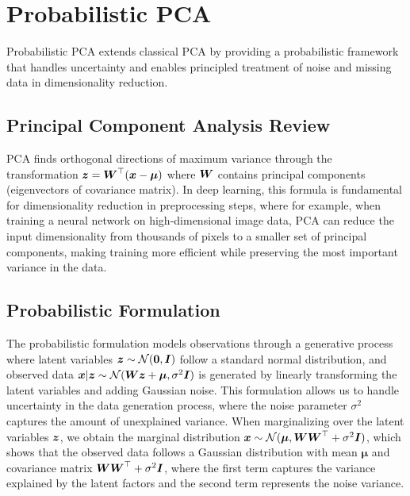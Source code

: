 
\section{Probabilistic PCA }
\label{sec:prob-pca}

Probabilistic PCA extends classical PCA by providing a probabilistic framework that handles uncertainty and enables principled treatment of noise and missing data in dimensionality reduction.

\subsection{Principal Component Analysis Review}

PCA finds orthogonal directions of maximum variance through the transformation $\boldsymbol{z} = \boldsymbol{W}^\top (\boldsymbol{x} - \boldsymbol{\mu})$ where $\boldsymbol{W}$ contains principal components (eigenvectors of covariance matrix). In deep learning, this formula is fundamental for dimensionality reduction in preprocessing steps, where for example, when training a neural network on high-dimensional image data, PCA can reduce the input dimensionality from thousands of pixels to a smaller set of principal components, making training more efficient while preserving the most important variance in the data.

\subsection{Probabilistic Formulation}

The probabilistic formulation models observations through a generative process where latent variables $\boldsymbol{z} \sim \mathcal{N}(\boldsymbol{0}, \boldsymbol{I})$ follow a standard normal distribution, and observed data $\boldsymbol{x} | \boldsymbol{z} \sim \mathcal{N}(\boldsymbol{W}\boldsymbol{z} + \boldsymbol{\mu}, \sigma^2 \boldsymbol{I})$ is generated by linearly transforming the latent variables and adding Gaussian noise. This formulation allows us to handle uncertainty in the data generation process, where the noise parameter $\sigma^2$ captures the amount of unexplained variance. When marginalizing over the latent variables $\boldsymbol{z}$, we obtain the marginal distribution $\boldsymbol{x} \sim \mathcal{N}(\boldsymbol{\mu}, \boldsymbol{W}\boldsymbol{W}^\top + \sigma^2 \boldsymbol{I})$, which shows that the observed data follows a Gaussian distribution with mean $\boldsymbol{\mu}$ and covariance matrix $\boldsymbol{W}\boldsymbol{W}^\top + \sigma^2 \boldsymbol{I}$, where the first term captures the variance explained by the latent factors and the second term represents the noise variance.

